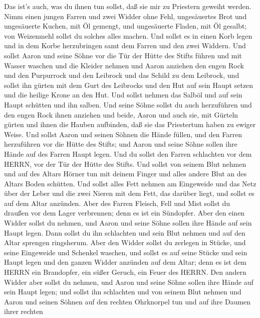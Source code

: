  Das ist's auch, was du ihnen tun sollst, daß sie mir zu
Priestern geweiht werden. Nimm einen jungen Farren und zwei Widder ohne
Fehl,  ungesäuertes Brot und ungesäuerte Kuchen, mit Öl
gemengt, und ungesäuerte Fladen, mit Öl gesalbt; von Weizenmehl sollst
du solches alles machen.  Und sollst es in einen Korb legen
und in dem Korbe herzubringen samt dem Farren und den zwei Widdern.
 Und sollst Aaron und seine Söhne vor die Tür der Hütte des
Stifts führen und mit Wasser waschen  und die Kleider nehmen
und Aaron anziehen den engen Rock und den Purpurrock und den Leibrock
und das Schild zu dem Leibrock, und sollst ihn gürten mit dem Gurt des
Leibrocks  und den Hut auf sein Haupt setzen und die heilige
Krone an den Hut.  Und sollst nehmen das Salböl und auf sein
Haupt schütten und ihn salben.  Und seine Söhne sollst du
auch herzuführen und den engen Rock ihnen anziehen  und
beide, Aaron und auch sie, mit Gürteln gürten und ihnen die Hauben
aufbinden, daß sie das Priestertum haben zu ewiger Weise. Und sollst
Aaron und seinen Söhnen die Hände füllen,  und den Farren
herzuführen vor die Hütte des Stifts; und Aaron und seine Söhne sollen
ihre Hände auf des Farren Haupt legen.  Und du sollst den
Farren schlachten vor dem HERRN, vor der Tür der Hütte des Stifts.
 Und sollst von seinem Blut nehmen und auf des Altars
Hörner tun mit deinem Finger und alles andere Blut an des Altars Boden
schütten.  Und sollst alles Fett nehmen am Eingeweide und
das Netz über der Leber und die zwei Nieren mit dem Fett, das darüber
liegt, und sollst es auf dem Altar anzünden.  Aber des
Farren Fleisch, Fell und Mist sollst du draußen vor dem Lager
verbrennen; denn es ist ein Sündopfer.  Aber den einen
Widder sollst du nehmen, und Aaron und seine Söhne sollen ihre Hände auf
sein Haupt legen.  Dann sollst du ihn schlachten und sein
Blut nehmen und auf den Altar sprengen ringsherum.  Aber
den Widder sollst du zerlegen in Stücke, und seine Eingeweide und
Schenkel waschen, und sollst es auf seine Stücke und sein Haupt legen
 und den ganzen Widder anzünden auf dem Altar; denn es ist
dem HERRN ein Brandopfer, ein süßer Geruch, ein Feuer des HERRN.
 Den andern Widder aber sollst du nehmen, und Aaron und
seine Söhne sollen ihre Hände auf sein Haupt legen;  und
sollst ihn schlachten und von seinem Blut nehmen und Aaron und seinen
Söhnen auf den rechten Ohrknorpel tun und auf ihre Daumen ihrer rechten
